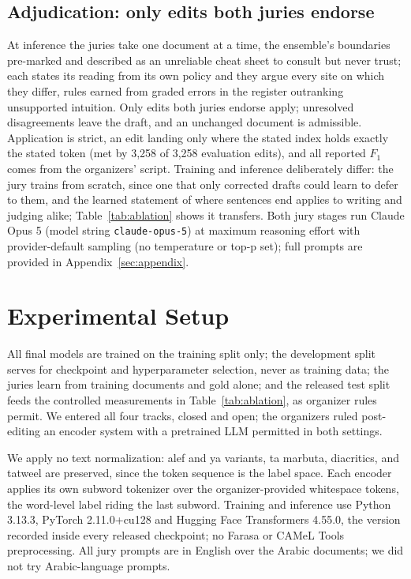 \documentclass[11pt]{article}
\begin{document}
\subsection{Adjudication: only edits both juries endorse}
\label{sec:adj}
At inference the juries take one document at a time, the ensemble's boundaries
pre-marked and described as an unreliable cheat sheet to consult but never trust;
each states its reading from its own policy and they argue every site on which they
differ, rules earned from graded errors in the register outranking unsupported
intuition. Only edits both juries endorse
apply; unresolved disagreements leave the draft, and an unchanged document is
admissible. Application is strict, an edit landing only
where the stated index holds exactly the stated token (met by 3{,}258 of 3{,}258
evaluation edits), and all reported $F_1$ comes from the organizers' script. Training and inference deliberately differ: the jury trains from scratch, since one
that only corrected drafts could learn to defer to them, and the learned statement of
where sentences end applies to writing and judging alike; Table~\ref{tab:ablation}
shows it transfers. Both jury stages run Claude Opus 5 (model string \texttt{claude-opus-5}) at
maximum reasoning effort with provider-default sampling (no temperature or top-p
set); full prompts are provided in Appendix~\ref{sec:appendix}.
\section{Experimental Setup}
All final models are trained on the training split only; the
development split serves for checkpoint and hyperparameter selection, never as
training data; the juries learn from training documents and gold alone; and the
released test split feeds the controlled measurements in Table~\ref{tab:ablation}, as
organizer rules permit. We entered all
four tracks, closed and open; the organizers ruled post-editing an encoder system with
a pretrained LLM permitted in both settings. %

We apply no text normalization: alef and ya variants, ta marbuta, diacritics, and
tatweel are preserved, since the token sequence is the label space. Each encoder
applies its own subword tokenizer over the organizer-provided whitespace tokens, the
word-level label riding the last subword. Training and inference
use Python 3.13.3, PyTorch 2.11.0+cu128 and Hugging Face Transformers 4.55.0, the
version recorded inside every released checkpoint; no Farasa or CAMeL
Tools preprocessing. All jury prompts are in English over the Arabic documents;
we did not try Arabic-language prompts.
\end{document}

